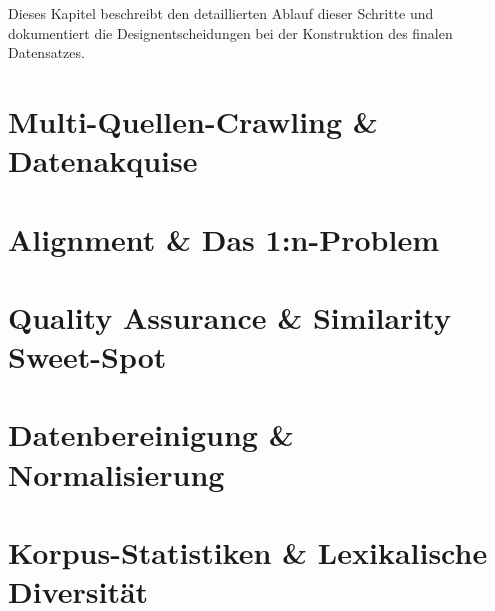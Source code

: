 Dieses Kapitel beschreibt den detaillierten Ablauf dieser Schritte und dokumentiert die Designentscheidungen bei der Konstruktion des finalen Datensatzes.

\section{Multi-Quellen-Crawling \& Datenakquise}

\section{Alignment \& Das 1:n-Problem}

\section{Quality Assurance \& Similarity Sweet-Spot}

\section{Datenbereinigung \& Normalisierung}

\section{Korpus-Statistiken \& Lexikalische Diversität}

